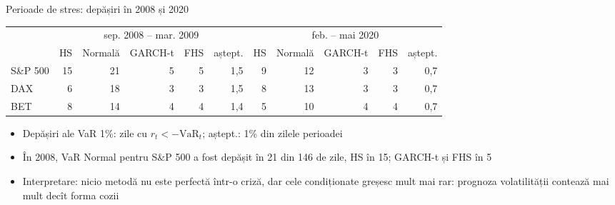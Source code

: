 \begin{frame}{Perioade de stres: depășiri în 2008 și 2020}
\itemsize{\footnotesize}
\begin{center}
\footnotesize
\begin{tabular}{l|rrrr|r|rrrr|r}
\toprule
& \multicolumn{5}{c|}{sep. 2008 -- mar. 2009} & \multicolumn{5}{c}{feb. -- mai 2020} \\ & HS & Normală & GARCH-t & FHS & aștept. & HS & Normală & GARCH-t & FHS & aștept. \\
\midrule
S\&P 500 & 15 & 21 & 5 & 5 & 1{,}5 & 9 & 12 & 3 & 3 & 0{,}7 \\
DAX & 6 & 18 & 3 & 3 & 1{,}5 & 8 & 13 & 3 & 3 & 0{,}7 \\
BET & 8 & 14 & 4 & 4 & 1{,}4 & 5 & 10 & 4 & 4 & 0{,}7 \\
\bottomrule
\end{tabular}
\end{center}
\begin{itemize}
    \item Depășiri ale VaR 1\%: zile cu $r_t < -\mathrm{VaR}_t$; aștept.: 1\% din zilele perioadei
    \item În 2008, VaR Normal pentru S\&P 500 a fost depășit în 21 din 146 de zile, HS în 15; GARCH-t și FHS în 5
    \item Interpretare: nicio metodă nu este perfectă într-o criză, dar cele condiționate greșesc mult mai rar: prognoza volatilității contează mai mult decît forma cozii
\end{itemize}
\end{frame}

